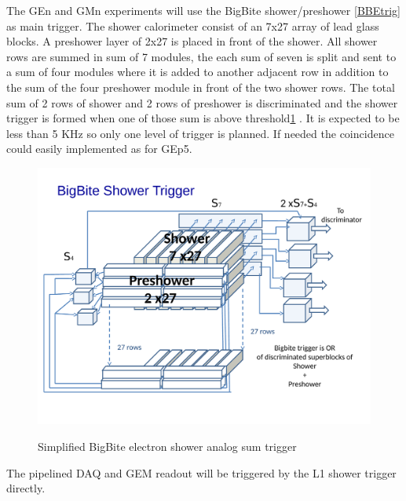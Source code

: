 \documentclass{article}
\begin{document}
\label{sec:neutron-trig}
The GEn and GMn experiments will use the BigBite shower/preshower \ref{BBEtrig} as main trigger.
The shower calorimeter consist of an 7x27 array of  lead glass blocks. A preshower
 layer of 2x27 is placed in front of the shower. All shower rows are summed in sum of 7 modules, the each sum of seven is split and sent to a sum of four modules where it is added to another adjacent row in addition to the sum of the four preshower module in front of the two shower rows. The total sum of 2 rows of shower and 2 rows of preshower is discriminated and the shower trigger is formed when one of those sum is above threshold\ref{BBEtrig3D} .
It is expected to be less than 5 KHz so only one level of trigger is planned.
 If needed the coincidence could 
easily implemented as for GEp5.
\begin{figure}
\includegraphics[scale=0.55]{figs/BBETrig3D.pdf}\\
\caption {Simplified BigBite electron shower analog sum trigger \label{BBEtrig3D}}
\end{figure}
The pipelined DAQ and GEM readout will be triggered by the L1 shower trigger directly.
\end{document}
